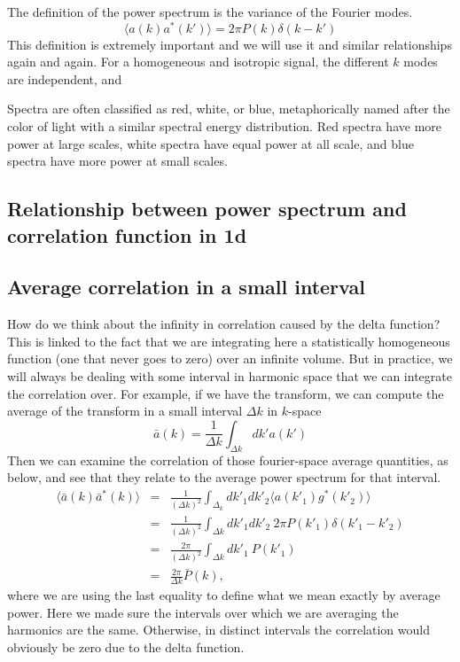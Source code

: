 The definition of the power spectrum is the variance of the Fourier modes.
\begin{equation}
  \langle a(k) a^*(k') \rangle = 2\pi P(k) \delta(k - k') 
\end{equation}
This definition is extremely important and we will use it and similar relationships again and again.  For a homogeneous and isotropic signal, the different $k$ modes are independent, and 

Spectra are often classified as red, white, or blue, metaphorically named after the color of light with a similar spectral energy distribution.  Red spectra have more power at large scales, white spectra have equal power at all scale, and blue spectra have more power at small scales.

\subsection{Relationship between power spectrum and correlation function in 1d}




\subsection{Average correlation in a small interval}
How do we think about the infinity in correlation caused by the delta function?  This is linked to the fact that we are integrating here a statistically homogeneous function (one that never goes to zero) over an infinite volume.  But in practice, we will always be dealing with some interval in harmonic space that we can integrate the correlation over.  For example, if we have the transform, we can compute the average of the transform in a small interval $\Delta k$ in $k$-space
\begin{equation}
  \bar a(k) = \frac{1}{\Delta k} \int_{\Delta k} dk' a(k')
\end{equation}
Then we can examine the correlation of those fourier-space average quantities, as below, and see that they relate to the average power spectrum for that interval. 
\begin{eqnarray}
  \langle \bar a(k)  \bar a^*(k) \rangle &=& \frac{1}{(\Delta k)^2} \int_{\Delta_k} dk'_1 dk'_2 \langle a(k'_1) g^*(k'_2) \rangle \\
  &=& \frac{1}{(\Delta k)^2} \int_{\Delta k} dk'_1 dk'_2 \ 2\pi P(k'_1) \delta(k'_1 - k'_2) \\
  &=& \frac{2\pi}{(\Delta k)^2}  \int_{\Delta k} dk'_1 \  P(k'_1) \\
  &=& \frac{2\pi}{\Delta k}  \bar P(k),
\end{eqnarray}
where we are using the last equality to define what we mean exactly by average power.  Here we made sure the intervals over which we are averaging the harmonics are the same.  Otherwise, in distinct intervals the correlation would obviously be zero due to the delta function.


